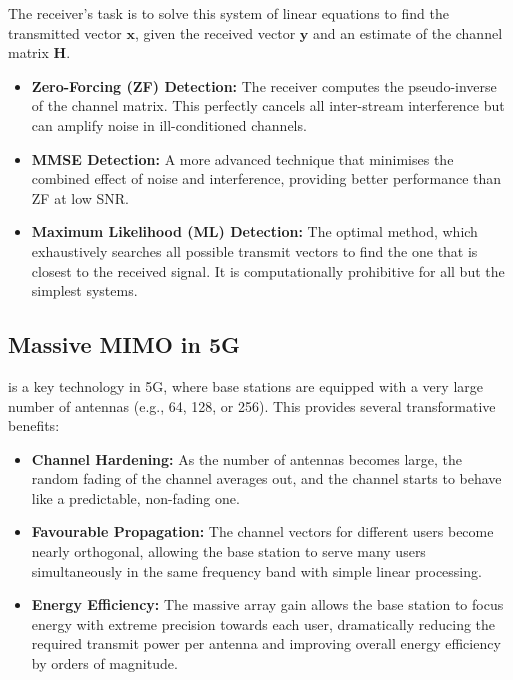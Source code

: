 The receiver's task is to solve this system of linear equations to find the transmitted vector $\mathbf{x}$, given the received vector $\mathbf{y}$ and an estimate of the channel matrix $\mathbf{H}$.
\begin{itemize}
    \item \textbf{Zero-Forcing (ZF) Detection:} The receiver computes the pseudo-inverse of the channel matrix. This perfectly cancels all inter-stream interference but can amplify noise in ill-conditioned channels.
    \item \textbf{MMSE Detection:} A more advanced technique that minimises the combined effect of noise and interference, providing better performance than ZF at low SNR.
    \item \textbf{Maximum Likelihood (ML) Detection:} The optimal method, which exhaustively searches all possible transmit vectors to find the one that is closest to the received signal. It is computationally prohibitive for all but the simplest systems.
\end{itemize}


\subsection{Massive MIMO in 5G}

 is a key technology in 5G, where base stations are equipped with a very large number of antennas (e.g., 64, 128, or 256). This provides several transformative benefits:
\begin{itemize}
    \item \textbf{Channel Hardening:} As the number of antennas becomes large, the random fading of the channel averages out, and the channel starts to behave like a predictable, non-fading one.
    \item \textbf{Favourable Propagation:} The channel vectors for different users become nearly orthogonal, allowing the base station to serve many users simultaneously in the same frequency band with simple linear processing.
    \item \textbf{Energy Efficiency:} The massive array gain allows the base station to focus energy with extreme precision towards each user, dramatically reducing the required transmit power per antenna and improving overall energy efficiency by orders of magnitude.
\end{itemize}


